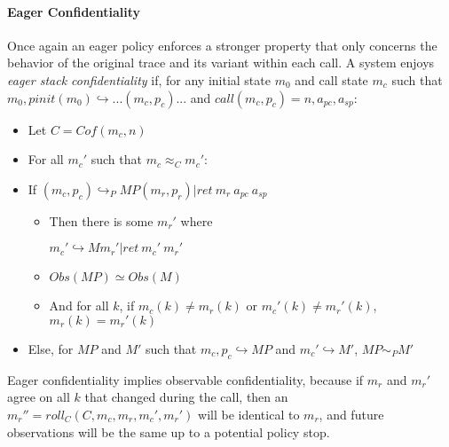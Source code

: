 \documentclass[conference]{IEEEtran}
\newcommand{\MP}{\mathit{MP}}
\begin{document}
    \paragraph{Eager Confidentiality}

      Once again an eager policy enforces a stronger property that only concerns the behavior of
      the original trace and its variant within each call. A system enjoys {\it eager stack
      confidentiality} if, for any initial state \(m_0\) and call state \(m_c\) such that
      \(m_0,\mathit{pinit}(m_0) \hookrightarrow ... (m_c,p_c) ...\) and
      \(\mathit{call}(m_c,p_c) = n, a_{pc}, a_{sp}\):

      \begin{itemize}
        \item Let \(C = \mathit{Cof}(m_c,n)\)
        \item For all \(m_c'\) such that \(m_c \approx_C m_c'\):
        \item If \((m_c,p_c) \hookrightarrow_P \MP (m_r,p_r) | \mathit{ret}\ m_r\ a_{pc}\ a_{sp}\)
          \begin{itemize}
            \item Then there is some \(m_r'\) where
              
              \(m_c' \hookrightarrow M m_r' | \mathit{ret}\ m_c'\ m_r'\)
            \item \(\mathit{Obs}(\MP) \simeq \mathit{Obs}(M)\)
            \item And for all \(k\), if \(m_c(k) \not = m_r(k)\) or \(m_c'(k) \not = m_r'(k)\),
              \(m_r(k) = m_r'(k)\)
          \end{itemize}
        \item Else, for \(\MP\) and \(M'\) such that \(m_c,p_c \hookrightarrow \MP\) and \(m_c' \hookrightarrow M'\),
          \(\MP \sim_P M'\)
      \end{itemize}

      Eager confidentiality implies observable confidentiality, because if \(m_r\) and \(m_r'\) agree
      on all \(k\) that changed during the call, then an \(m_r'' = \mathit{roll}_C(C,m_c,m_r,m_c',m_r')\)
      will be identical to \(m_r\), and future observations will be the same up to a potential policy
      stop.
 
\end{document}
